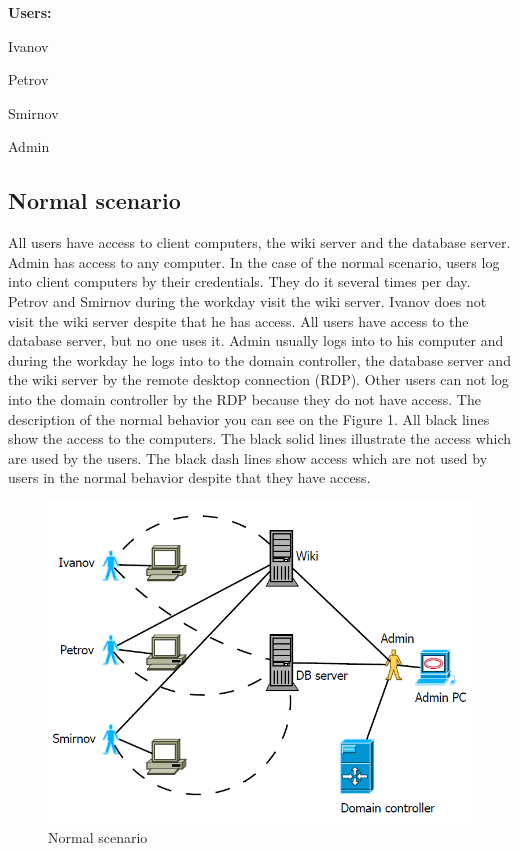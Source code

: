 \begin{compactitem}
\item [\textbf{Users:}]
\item Ivanov
\item Petrov
\item Smirnov
\item Admin
\end{compactitem}
     
\subsection{Normal scenario}
All users have access to client computers, the wiki server and the database server. Admin has access to any computer. In the case of the normal scenario, users log into client computers by their credentials. They do it several times per day. Petrov and Smirnov during the workday visit the wiki server. Ivanov does not visit the wiki server despite that he has access. All users have access to the database server, but no one uses it. Admin usually logs into to his computer and during the workday he logs into to the domain controller, the database server and the wiki server by the remote desktop connection (RDP). Other users can not log into the domain controller by the RDP because they do not have access. The description of the normal behavior you can see on the Figure 1. All black lines show the access to the computers. The black solid lines illustrate the access which are used by the users. The black dash lines show access which are not used by users in the normal behavior despite that they have access. 
\begin{figure}[ht!]
\centering
\includegraphics[width=\textwidth]{scenario_normal.png}
\caption{Normal scenario}
\label{overflow}
\end{figure}

